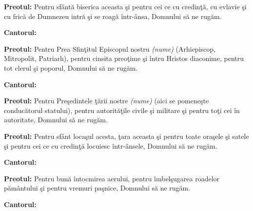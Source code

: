 \documentclass[12pt]{book}
\begin{document}
  \pagebreak

  {\bf Preotul:} Pentru sf\^{a}nt\u{a} biserica aceasta \c{s}i pentru
  cei ce cu credin\c{t}\u{a}, cu evlavie \c{s}i cu fric\u{a} de
  Dumnezeu intr\u{a} \c{s}i se roag\u{a} \^{i}ntr-\^{a}nsa, Domnului
  s\u{a} ne rug\u{a}m.

  {\bf Cantorul:}
  \begin{figure}[h]
    \begin{center}
    \end{center}
  \end{figure}

  {\bf Preotul:} Pentru Prea Sfin\c{t}itul Episcopul nostru {\em
  (nume)} (Arhiepiscop, Mitropolit, Patriarh), pentru cinsita
  preo\c{t}ime \c{s}i \^{i}ntru Hristos diaconime, pentru tot clerul
  \c{s}i poporul, Domnului s\u{a} ne rug\u{a}m.

  {\bf Cantorul:}
  \begin{figure}[h]
    \begin{center}
    \end{center}
  \end{figure}

  \pagebreak

  {\bf Preotul:} Pentru Pre\c{s}edintele \c{t}\u{a}rii nostre {\em
  (nume)} (aici se pomene\c{s}te conduc\u{a}torul statului), pentru
  autorit\u{a}\c{t}ile civile \c{s}i militare \c{s}i pentru to\c{t}i
  cei \^{i}n autoritate, Domnului s\u{a} ne rug\u{a}m.
  
  {\bf Preotul:} Pentru sf\^{a}nt loca\c{s}ul acesta, \c{t}ara aceasta
  \c{s}i pentru toate ora\c{s}ele \c{s}i satele \c{s}i pentru cei ce
  cu credin\c{t}\u{a} locuiesc \^{i}ntr-\^{a}nsele, Domnului s\u{a} ne
  rug\u{a}m.

  {\bf Cantorul:}
  \begin{figure}[h]
    \begin{center}
    \end{center}
  \end{figure}

  {\bf Preotul:} Pentru bun\u{a} \^{i}ntocmirea aerului, pentru
  \^{i}mbel\c{s}ugarea roadelor p\u{a}m\^{a}ntului \c{s}i pentru
  vremuri pa\c{s}nice, Domnului s\u{a} ne rug\u{a}m.

  {\bf Cantorul:}
  \begin{figure}[h]
    \begin{center}
    \end{center}
  \end{figure}
\end{document}
